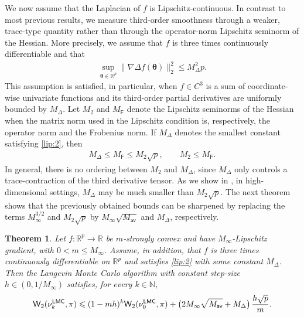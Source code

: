 \documentclass[aos,reqno]{imsart}
\newcommand\btheta{\boldsymbol\theta}
\def\wass{\mathsf{W}}
\def\Mav{M_{\textsf{av}}}
\def\Mmax{M_{\infty}}
\newtheorem{theorem}{Theorem}
\theoremstyle{definition}
\begin{document}
We now assume that the Laplacian of $f$ is
Lipschitz-continuous. In contrast to most previous
results, we measure third-order smoothness through a
weaker, trace-type quantity rather than through the
operator-norm Lipschitz seminorm of the Hessian. More
precisely, we assume that $f$ is three times continuously
differentiable and that
\begin{align}\label{lip:2}
    \sup_{\btheta\in\mathbb R^p} \|\nabla \Delta 
    f(\btheta)\|_2^2 \leqslant M^2_{\Delta}p.
\end{align}
This assumption is satisfied, in particular, when
$f\in C^3$ is a sum of coordinate-wise univariate
functions and its third-order partial derivatives are
uniformly bounded by $M_\Delta$. Let $M_2$ and
$M_{\mathsf F}$ denote the Lipschitz seminorms of the
Hessian when the matrix norm used in the Lipschitz
condition is, respectively, the operator norm and the
Frobenius norm. If $M_\Delta$ denotes the smallest
constant satisfying \eqref{lip:2}, then
\begin{align}
    M_\Delta\leqslant M_{\mathsf F}
    \leqslant M_2\sqrt p,
    \qquad
    M_2\leqslant M_{\mathsf F}.
\end{align}
In general, there is no ordering between $M_2$ and
$M_\Delta$, since $M_\Delta$ only controls a
trace-contraction of the third derivative tensor. As we
show in , in high-dimensional settings,
$M_\Delta$ may be much smaller than $M_2\sqrt p$. The
next theorem shows that the previously obtained bounds
can be sharpened by replacing the terms $\Mmax^{3/2}$
and $M_2\sqrt p$ by $\Mmax\sqrt{\Mav}$ and $M_\Delta$,
respectively.

\begin{theorem}\label{th:3}
    Let $f:\mathbb R^p\to\mathbb R$ be $m$-strongly convex 
    and have $\Mmax$-Lipschitz gradient, with $0<m\leqslant 
    \Mmax$. Assume, in addition, that $f$ is three times 
    continuously differentiable on $\mathbb R^p$ and satisfies 
    \eqref{lip:2} with some constant $M_\Delta$. Then the 
    Langevin Monte Carlo algorithm with constant step-size
    $h\in (0,1/\Mmax)$ satisfies, for every $k\in\mathbb N$,
    \begin{align}\label{claim3c}
        \wass_2(\nu^{\sf LMC}_{k}, \pi) 
        \leqslant (1-mh)^k \wass_2(\nu^{\sf LMC}_0,\pi) + 
        \big(2\Mmax \sqrt{\Mav}  + M_\Delta\big)\,
        \frac{h\sqrt{p}}{m}.
    \end{align}
\end{theorem}
\end{document}

